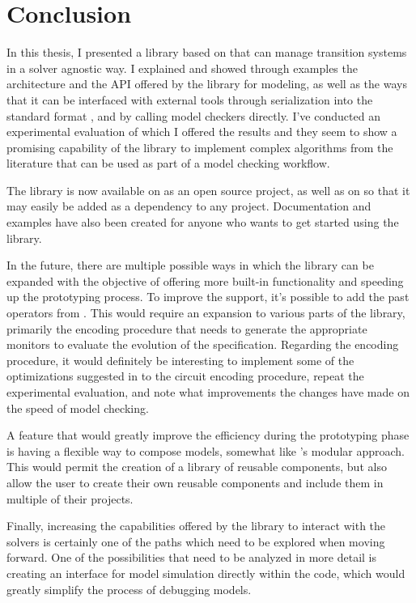 \chapter{Conclusion}
\label{ch:conclusions}

In this thesis, I presented \pyvmt{} a \python{} library based on \pysmt{} that can manage transition systems in a solver agnostic way.
I explained and showed through examples the architecture and the API offered by the library for modeling, as well as the ways that it can be interfaced with external tools through serialization into the standard format \vmtlib{}, and by calling model checkers directly.
I've conducted an experimental evaluation of which I offered the results and they seem to show a promising capability of the library to implement complex algorithms from the literature that can be used as part of a model checking workflow.

The library is now available on \github{} as an open source project, as well as on \pypi{} so that it may easily be added as a dependency to any project.
Documentation and examples have also been created for anyone who wants to get started using the library.

In the future, there are multiple possible ways in which the library can be expanded with the objective of offering more built-in functionality and speeding up the prototyping process.
To improve the \ltl{} support, it's possible to add the past operators from \pltl{}.
This would require an expansion to various parts of the library, primarily the encoding procedure that needs to generate the appropriate monitors to evaluate the evolution of the specification.
Regarding the \ltl{} encoding procedure, it would definitely be interesting to implement some of the optimizations suggested in \cite{DBLP:conf/fmcad/ClaessenES13} to the \ltl{} circuit encoding procedure, repeat the experimental evaluation, and note what improvements the changes have made on the speed of model checking.

A feature that would greatly improve the efficiency during the prototyping phase is having a flexible way to compose models, somewhat like \nuxmv{}'s modular approach.
This would permit the creation of a library of reusable components, but also allow the user to create their own reusable components and include them in multiple of their projects.

Finally, increasing the capabilities offered by the library to interact with the solvers is certainly one of the paths which need to be explored when moving forward.
One of the possibilities that need to be analyzed in more detail is creating an interface for model simulation directly within the \python{} code, which would greatly simplify the process of debugging models.
